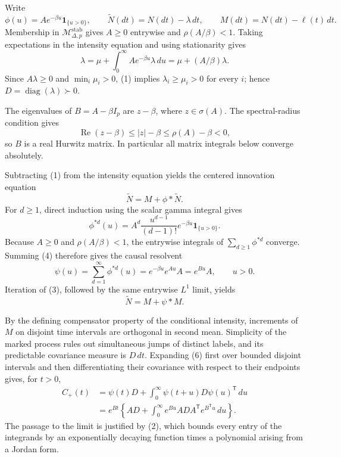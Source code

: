 Write
\[
 \phi(u)=Ae^{-\beta u}\mathbf 1_{\{u>0\}},\qquad
 \widetilde N(dt)=N(dt)-\lambda\,dt,\qquad
 M(dt)=N(dt)-\ell(t)\,dt.
\]
Membership in \(\mathcal M_{\Delta,p}^{\mathrm{stab}}\) gives \(A\geq0\) entrywise and \(\rho(A/\beta)<1\).  Taking expectations in the intensity equation and using stationarity gives
\[
 \lambda=\mu+\int_0^\infty Ae^{-\beta u}\lambda\,du
 =\mu+(A/\beta)\lambda.
\tag{1}
\]
Since \(A\lambda\geq0\) and \(\min_i\mu_i>0\), (1) implies \(\lambda_i\geq\mu_i>0\) for every \(i\); hence \(D=\operatorname{diag}(\lambda)\succ0\).

The eigenvalues of \(B=A-\beta I_p\) are \(z-\beta\), where \(z\in\sigma(A)\).  The spectral-radius condition gives
\[
 \operatorname{Re}(z-\beta)\leq |z|-\beta\leq\rho(A)-\beta<0,
\tag{2}
\]
so \(B\) is a real Hurwitz matrix.  In particular all matrix integrals below converge absolutely.

Subtracting (1) from the intensity equation yields the centered innovation equation
\[
 \widetilde N=M+\phi*\widetilde N.
\tag{3}
\]
For \(d\geq1\), direct induction using the scalar gamma integral gives
\[
 \phi^{*d}(u)=A^d\frac{u^{d-1}}{(d-1)!}e^{-\beta u}\mathbf1_{\{u>0\}}.
\tag{4}
\]
Because \(A\geq0\) and \(\rho(A/\beta)<1\), the entrywise integrals of \(\sum_{d\geq1}\phi^{*d}\) converge.  Summing (4) therefore gives the causal resolvent
\[
 \psi(u)=\sum_{d=1}^{\infty}\phi^{*d}(u)
 =e^{-\beta u}e^{Au}A=e^{Bu}A,\qquad u>0.
\tag{5}
\]
Iteration of (3), followed by the same entrywise \(L^1\) limit, yields
\[
 \widetilde N=M+\psi*M.
\tag{6}
\]

By the defining compensator property of the conditional intensity, increments of \(M\) on disjoint time intervals are orthogonal in second mean.  Simplicity of the marked process rules out simultaneous jumps of distinct labels, and its predictable covariance measure is \(D\,dt\).  Expanding (6) first over bounded disjoint intervals and then differentiating their covariance with respect to their endpoints gives, for \(t>0\),
\[
 \begin{aligned}
 C_+(t)
 &=\psi(t)D+\int_0^\infty\psi(t+u)D\psi(u)^{\mathsf T}\,du\\
 &=e^{Bt}\left\{AD+\int_0^\infty e^{Bu}ADA^{\mathsf T}e^{B^{\mathsf T}u}\,du\right\}.
 \end{aligned}
\tag{7}
\]
The passage to the limit is justified by (2), which bounds every entry of the integrands by an exponentially decaying function times a polynomial arising from a Jordan form.

